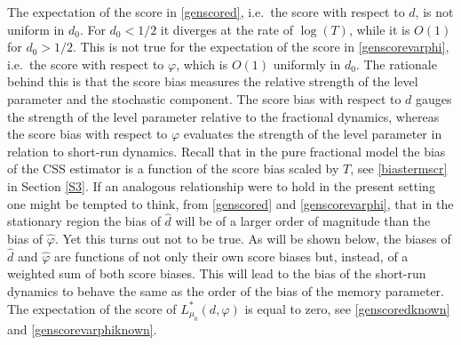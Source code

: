 {{The expectation of the score in \eqref{genscored}, i.e.\ the score with respect to $d$, is not uniform in $d_0$. For $d_0 < 1/2$ it diverges at the rate of $\log(T)$, while it is $O(1)$ for $d_0 > 1/2$. This is not true for the expectation of the score in \eqref{genscorevarphi}, i.e.\ the score with respect to $\varphi$, which is $O(1)$ uniformly in $d_0$. The rationale behind this is that the score bias measures the relative strength of the level parameter and the stochastic component. The score bias with respect to $d$ gauges the strength of the level parameter relative to the fractional dynamics, whereas the score bias with respect to $\varphi$ evaluates the strength of the level parameter in relation to short-run dynamics. Recall that in the pure fractional model the bias of the CSS estimator is a function of the score bias scaled by $T$, see \eqref{biastermscr} in Section \ref{S3}. If an analogous relationship were to hold in the present setting one might be tempted to think, from \eqref{genscored} and \eqref{genscorevarphi}, that in the stationary region the bias of $\hat{d}$ will be of a larger order of magnitude than the bias of $\hat{\varphi}$.
Yet this turns out not to be true. As will be shown below, the biases of $\hat{d}$ and $\hat{\varphi}$ are functions of not only their own score biases but, instead, of a weighted sum of both score biases. This will lead to the bias of the short-run dynamics to behave the same as the order of the bias of the memory parameter. The expectation of the score of $L_{\mu_0}^*(d,\varphi)$ is equal to zero, see \eqref{genscoredknown} and \eqref{genscorevarphiknown}. 

}}
